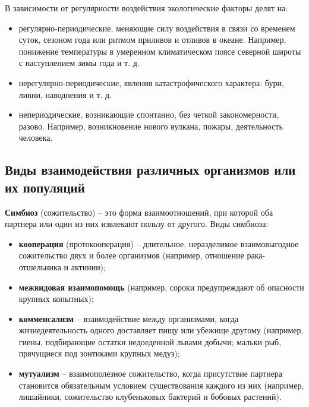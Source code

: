 \documentclass[a5paper, 11pt]{extarticle}
\theoremstyle{definition}
\theoremstyle{definition}
\theoremstyle{definition}
\numberwithin{figure}{section}
\begin{document}
В зависимости от регулярности воздействия экологические факторы делят на:
\begin{itemize}
    \item регулярно-периодические, меняющие силу воздействия в связи со временем суток, сезоном года или ритмом приливов и отливов в океане. Например, понижение температуры в умеренном климатическом поясе северной широты с наступлением зимы года и т. д.
    \item нерегулярно-периодические, явления катастрофического характера: бури, ливни, наводнения и т. д.
    \item непериодические, возникающие спонтанно, без четкой закономерности, разово. Например, возникновение нового вулкана, пожары, деятельность человека.
\end{itemize}

\subsection{Виды взаимодействия различных организмов или их популяций}

\textbf{Симбиоз} (сожительство) -- это форма взаимоотношений, при которой оба партнера или один из них извлекают пользу от другого. Виды симбиоза:
\begin{itemize}
    \item \textbf{кооперация} (протокооперация) -- длительное, неразделимое взаимовыгодное сожительство двух и более организмов (например, отношение рака-отшельника и актинии);
    \item \textbf{межвидовая взаимопомощь} (например, сороки предупреждают об опасности крупных копытных);
    \item \textbf{комменсализм} -- взаимодействие между организмами, когда жизнедеятельность одного доставляет пищу или убежище другому (например, гиены, подбирающие остатки недоеденной львами добычи; мальки рыб, прячущиеся под зонтиками крупных медуз);
    \item \textbf{мутуализм} -- взаимополезное сожительство, когда присутствие партнера становится обязательным условием существования каждого из них (например, лишайники, сожительство клубеньковых бактерий и бобовых растений).
\end{itemize}
\end{document}
